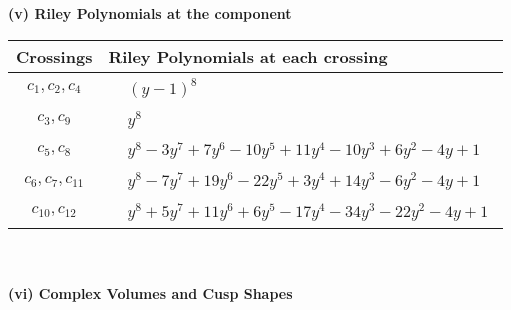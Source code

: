 \documentclass[1p]{elsarticle_modified}
\theoremstyle{definition}
\begin{document}
\newpage\renewcommand{\arraystretch}{1}
\flushleft \textbf{(v) Riley Polynomials at the component}\newline \\
\begin{tabular}{m{50pt}|m{274pt}}
Crossings & \hspace{64pt}Riley Polynomials at each crossing \\
\hline $$\begin{aligned}c_{1},c_{2},c_{4}\end{aligned}$$&$\begin{aligned}
&(y-1)^8
\end{aligned}$\\
\hline $$\begin{aligned}c_{3},c_{9}\end{aligned}$$&$\begin{aligned}
&y^8
\end{aligned}$\\
\hline $$\begin{aligned}c_{5},c_{8}\end{aligned}$$&$\begin{aligned}
&y^8-3 y^7+7 y^6-10 y^5+11 y^4-10 y^3+6 y^2-4 y+1
\end{aligned}$\\
\hline $$\begin{aligned}c_{6},c_{7},c_{11}\end{aligned}$$&$\begin{aligned}
&y^8-7 y^7+19 y^6-22 y^5+3 y^4+14 y^3-6 y^2-4 y+1
\end{aligned}$\\
\hline $$\begin{aligned}c_{10},c_{12}\end{aligned}$$&$\begin{aligned}
&y^8+5 y^7+11 y^6+6 y^5-17 y^4-34 y^3-22 y^2-4 y+1
\end{aligned}$\\
\hline
\end{tabular}\\~\\
\newpage\flushleft \textbf{(vi) Complex Volumes and Cusp Shapes}
\end{document}
